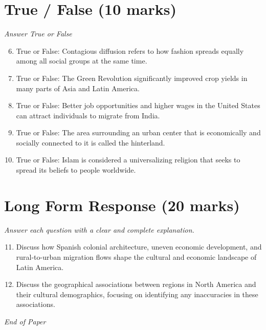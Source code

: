 \documentclass[12pt]{article}
\begin{document}
\section*{True / False (10 marks)}
\textit{Answer True or False}
\begin{enumerate}[label=\arabic*.]
\setcounter{enumi}{5}
\item True or False: Contagious diffusion refers to how fashion spreads equally among all social groups at the same time.
\item True or False: The Green Revolution significantly improved crop yields in many parts of Asia and Latin America.
\item True or False: Better job opportunities and higher wages in the United States can attract individuals to migrate from India.
\item True or False: The area surrounding an urban center that is economically and socially connected to it is called the hinterland.
\item True or False: Islam is considered a universalizing religion that seeks to spread its beliefs to people worldwide.
\end{enumerate}

\section*{Long Form Response (20 marks)}
\textit{Answer each question with a clear and complete explanation.}
\begin{enumerate}[label=\arabic*.]
\setcounter{enumi}{10}
\item Discuss how Spanish colonial architecture, uneven economic development, and rural-to-urban
migration flows shape the cultural and economic landscape of Latin America.
\item Discuss the geographical associations between regions in North America and their cultural
demographics, focusing on identifying any inaccuracies in these associations.
\end{enumerate}

\vfill
\noindent\textit{End of Paper}
\end{document}
